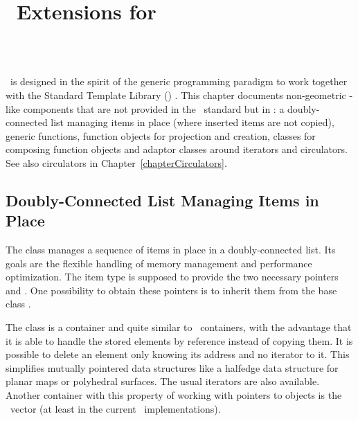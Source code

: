 
\ccParDims

\chapter{\stl\ Extensions for \cgal}
\label{chapterDataStructures}
\label{chapterStlExtensions}
\\
\\

\cgal\ is designed in the spirit of the generic programming paradigm
to work together with the Standard Template Library (\stl)
\cite{c-wpdpi-96,ms-strg-96}.  This chapter documents non-geometric
\stl-like components that are not provided in the \stl\ standard but
in \cgal: a doubly-connected list managing items in place
(where inserted items are not copied), generic
functions, function objects for projection and creation, classes for
composing function objects and adaptor classes around iterators and
circulators. See also circulators in Chapter~\ref{chapterCirculators}.


\section{Doubly-Connected List Managing Items in Place}

The class  manages a
sequence of items in place in a doubly-connected list. Its goals are
the flexible handling of memory management and performance
optimization. The item type is supposed to provide the two necessary
pointers  and . One possibility
to obtain these pointers is to inherit them from the base class
.

The class  is a container and quite
similar to \stl\ containers, with the advantage that it is able to
handle the stored elements by reference instead of copying them. It is
possible to delete an element only knowing its address and no iterator
to it. This simplifies mutually pointered data structures like a
halfedge data structure for planar maps or polyhedral surfaces. The
usual iterators are also available.  Another container with this
property of working with pointers to objects is the \stl\ vector (at
least in the current \stl\ implementations).


